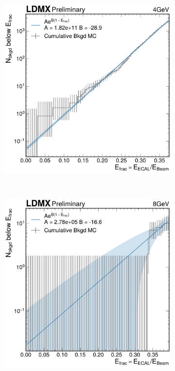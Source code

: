 \begin{figure}
  \centering
  \begin{subfigure}{0.48\textwidth}
    \includegraphics[width=\textwidth]{figures/ldmx/analysis/4gev-cumulative-bkgd-fit.pdf}
  \end{subfigure}
  ~
  \begin{subfigure}{0.48\textwidth}
    \includegraphics[width=\textwidth]{figures/ldmx/analysis/8gev-cumulative-bkgd-fit.pdf}

\end{subfigure}
\end{figure}
